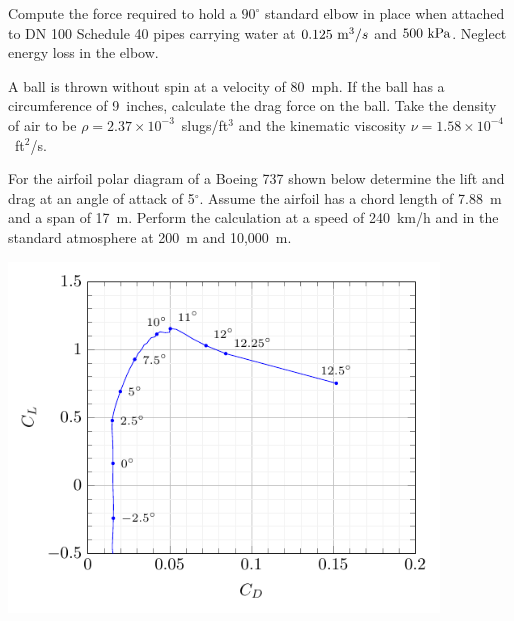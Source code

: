 \documentclass[12pt]{article}
\begin{document}
\begin{question}

Compute the force required to hold a $90^\circ$ standard elbow in place when attached to DN 100 Schedule 40 pipes carrying water at $0.125~\mathrm{m}^3/s$ and $500~\mathrm{kPa}$.  Neglect energy loss in the elbow.

\end{question}

\begin{question}

A ball is thrown without spin at a velocity of 80~mph.  If the ball has a circumference of 9~inches, calculate the drag force on the ball.  Take the density of air to be $\rho=2.37\times 10^{-3}$~slugs/ft$^3$ and the kinematic viscosity $\nu=1.58\times 10^{-4}$~ft$^2$/s.

\end{question}

\begin{question}
For the airfoil polar diagram of a Boeing 737 shown below determine the lift and drag at an angle of attack of 5$^\circ$.  Assume the airfoil has a chord length of 7.88~m and a span of 17~m.  Perform the calculation at a speed of 240~km/h and in the standard atmosphere at 200~m and 10,000~m.

\includegraphics[width=4.5in]{imgs/b737.pdf}

\end{question}
\end{document}

